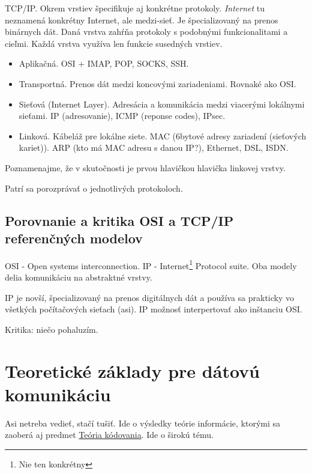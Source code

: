 \documentclass[10pt,a4paper]{article}
\begin{document}
TCP/IP. Okrem vrstiev špecifikuje aj konkrétne protokoly. \emph{Internet} tu neznamená konkrétny Internet, ale medzi-sieť. Je špecializovaný na prenos binárnych dát. 
Daná vrstva zahŕňa protokoly s podobnými funkcionalitami a cieľmi. Každá vrstva využíva len funkcie susedných vrstiev. 
 
\begin{itemize}
\item Aplikačná. OSI + IMAP, POP, SOCKS, SSH.            
\item Transportná. Prenos dát medzi koncovými zariadeniami. Rovnaké ako OSI.     
\item Sieťová (Internet Layer). Adresácia a komunikácia medzi viacerými lokálnymi sieťami. IP (adresovanie), ICMP (reponse codes), IPsec.      
\item Linková. Kábeláž pre lokálne siete. MAC (6bytové adresy zariadení (sieťových kariet)). ARP (kto má MAC adresu s danou IP?), Ethernet, DSL, ISDN.      
\end{itemize}

Poznamenajme, že v skutočnosti je prvou hlavičkou hlavička linkovej vrstvy. 

Patrí sa porozprávať o jednotlivých protokoloch. 

\subsection{Porovnanie a kritika OSI a TCP/IP referenčných modelov}    

OSI - Open systems interconnection. IP - Internet\footnote{Nie ten konkrétny} Protocol suite. Oba modely delia komunikáciu na abstraktné vrstvy. 

IP je novší, špecializovaný na prenos digitálnych dát a používa sa prakticky vo všetkých počítačových sieťach (asi).
IP možnosť interpertovať ako inštanciu OSI.  

Kritika: niečo pohaluzím. 
        
\section{Teoretické základy pre dátovú komunikáciu} 

Asi netreba vedieť, stačí tušiť. Ide o výsledky teórie informácie, ktorými sa zaoberá aj predmet \href{http://www.dcs.fmph.uniba.sk/texty/codebook.pdf}{Teória kódovania}. Ide o širokú tému. 
\end{document}
